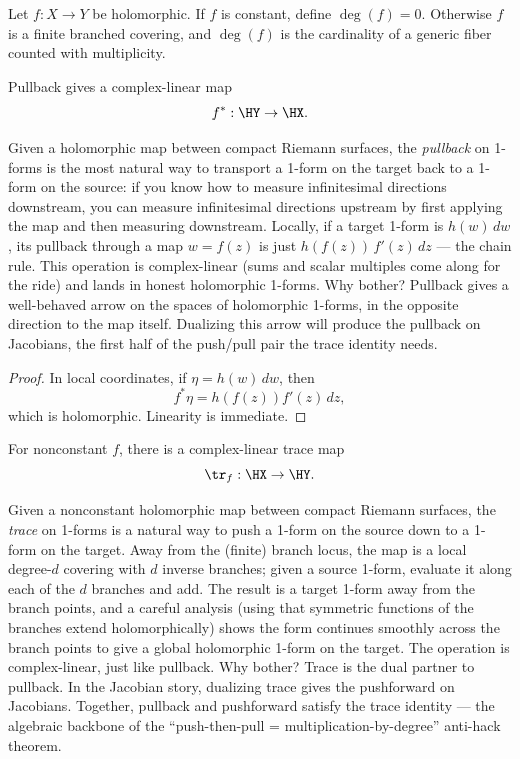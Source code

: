 Let \(f:X\to Y\) be holomorphic. If \(f\) is constant, define
\(\deg(f)=0\). Otherwise \(f\) is a finite branched covering, and
\(\deg(f)\) is the cardinality of a generic fiber counted with multiplicity.

\begin{lemma}
\label{lem:pullback-forms}
Pullback gives a complex-linear map
\[
  f^{*}:\HY\to\HX.
\]
\leanok
\end{lemma}

\begin{layman}
Given a holomorphic map between compact Riemann surfaces, the
\emph{pullback} on 1-forms is the most natural way to transport a
1-form on the target back to a 1-form on the source: if you know how
to measure infinitesimal directions downstream, you can measure
infinitesimal directions upstream by first applying the map and then
measuring downstream. Locally, if a target 1-form is \(h(w)\,dw\), its
pullback through a map \(w = f(z)\) is just \(h(f(z))\,f'(z)\,dz\) —
the chain rule. This operation is complex-linear (sums and scalar
multiples come along for the ride) and lands in honest holomorphic
1-forms. Why bother? Pullback gives a well-behaved arrow on the spaces
of holomorphic 1-forms, in the opposite direction to the map itself.
Dualizing this arrow will produce the pullback on Jacobians, the first
half of the push/pull pair the trace identity needs.
\end{layman}

\begin{proof}
\leanok
In local coordinates, if \(\eta=h(w)\,dw\), then
\[
  f^{*}\eta = h(f(z))f'(z)\,dz,
\]
which is holomorphic. Linearity is immediate.
\end{proof}

\begin{lemma}
\label{lem:trace-forms}
For nonconstant \(f\), there is a complex-linear trace map
\[
  \tr_f:\HX\to\HY.
\]
\leanok
\end{lemma}

\begin{layman}
Given a nonconstant holomorphic map between compact Riemann surfaces,
the \emph{trace} on 1-forms is a natural way to push a 1-form on the
source down to a 1-form on the target. Away from the (finite) branch
locus, the map is a local degree-\(d\) covering with \(d\) inverse
branches; given a source 1-form, evaluate it along each of the \(d\)
branches and add. The result is a target 1-form away from the branch
points, and a careful analysis (using that symmetric functions of the
branches extend holomorphically) shows the form continues smoothly
across the branch points to give a global holomorphic 1-form on the
target. The operation is complex-linear, just like pullback. Why
bother? Trace is the dual partner to pullback. In the Jacobian story,
dualizing trace gives the pushforward on Jacobians. Together,
pullback and pushforward satisfy the trace identity — the algebraic
backbone of the ``push-then-pull = multiplication-by-degree''
anti-hack theorem.
\end{layman}

